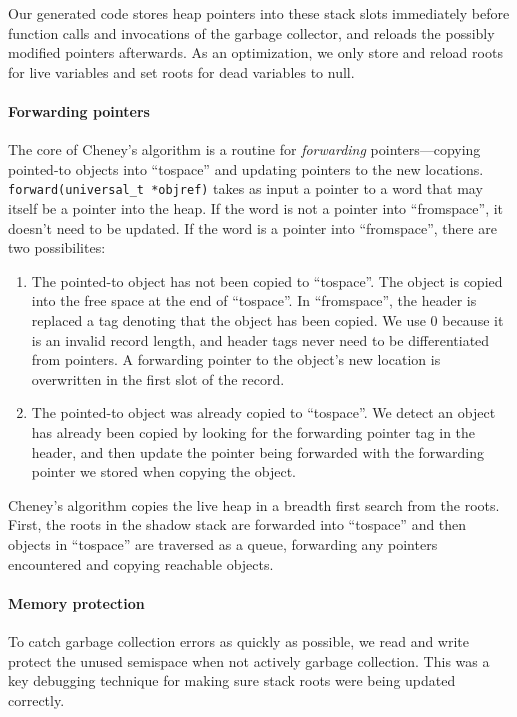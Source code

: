 \documentclass{article}
\begin{document}
Our generated code stores heap pointers into these stack slots immediately before function calls and invocations of the garbage collector, and reloads the possibly modified pointers afterwards. As an optimization, we only store and reload roots for live variables and set roots for dead variables to null.

\paragraph{Forwarding pointers} The core of Cheney's algorithm is a routine for \emph{forwarding} pointers---copying pointed-to objects into ``tospace'' and updating pointers to the new locations. \lstinline!forward(universal_t *objref)! takes as input a pointer to a word that may itself be a pointer into the heap. If the word is not a pointer into ``fromspace'', it doesn't need to be updated. If the word is a pointer into ``fromspace'', there are two possibilites:
\begin{enumerate}
\item The pointed-to object has not been copied to ``tospace''. The object is copied into the free space at the end of ``tospace''. In ``fromspace'', the header is replaced a tag denoting that the object has been copied. We use 0 because it is an invalid record length, and header tags never need to be differentiated from pointers. A forwarding pointer to the object's new location is overwritten in the first slot of the record.
\item The pointed-to object was already copied to ``tospace''. We detect an object has already been copied by looking for the forwarding pointer tag in the header, and then update the pointer being forwarded with the forwarding pointer we stored when copying the object.
\end{enumerate}
Cheney's algorithm copies the live heap in a breadth first search from the roots. First, the roots in the shadow stack are forwarded into ``tospace'' and then objects in ``tospace'' are traversed as a queue, forwarding any pointers encountered and copying reachable objects.

\paragraph{Memory protection} To catch garbage collection errors as quickly as possible, we read and write protect the unused semispace when not actively garbage collection. This was a key debugging technique for making sure stack roots were being updated correctly.
\end{document}
